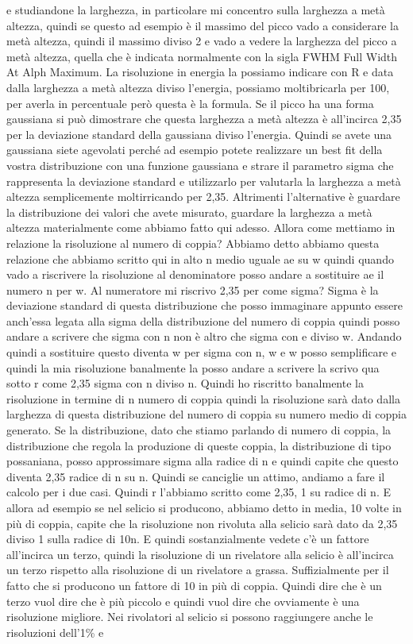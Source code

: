 e studiandone la larghezza, in particolare mi concentro sulla larghezza a metà altezza, quindi se questo ad esempio è il massimo del picco vado a considerare la metà altezza, quindi il massimo diviso 2 e vado a vedere la larghezza del picco a metà altezza, quella che è indicata normalmente con la sigla FWHM Full Width At Alph Maximum. La risoluzione in energia la possiamo indicare con R e data dalla larghezza a metà altezza diviso l'energia, possiamo moltibricarla per 100, per averla in percentuale però questa è la formula. Se il picco ha una forma gaussiana si può dimostrare che questa larghezza a metà altezza è all'incirca 2,35 per la deviazione standard della gaussiana diviso l'energia. Quindi se avete una gaussiana siete agevolati perché ad esempio potete realizzare un best fit della vostra distribuzione con una funzione gaussiana e strare il parametro sigma che rappresenta la deviazione standard e utilizzarlo per valutarla la larghezza a metà altezza semplicemente moltirricando per 2,35. Altrimenti l'alternative è guardare la distribuzione dei valori che avete misurato, guardare la larghezza a metà altezza materialmente come abbiamo fatto qui adesso. Allora come mettiamo in relazione la risoluzione al numero di coppia? Abbiamo detto abbiamo questa relazione che abbiamo scritto qui in alto n medio uguale ae su w quindi quando vado a riscrivere la risoluzione al denominatore posso andare a sostituire ae il numero n per w. Al numeratore mi riscrivo 2,35 per come sigma? Sigma è la deviazione standard di questa distribuzione che posso immaginare appunto essere anch'essa legata alla sigma della distribuzione del numero di coppia quindi posso andare a scrivere che sigma con n non è altro che sigma con e diviso w. Andando quindi a sostituire questo diventa w per sigma con n, w e w posso semplificare e quindi la mia risoluzione banalmente la posso andare a scrivere la scrivo qua sotto r come 2,35 sigma con n diviso n. Quindi ho riscritto banalmente la risoluzione in termine di n numero di coppia quindi la risoluzione sarà dato dalla larghezza di questa distribuzione del numero di coppia su numero medio di coppia generato. Se la distribuzione, dato che stiamo parlando di numero di coppia, la distribuzione che regola la produzione di queste coppia, la distribuzione di tipo possaniana, posso approssimare sigma alla radice di n e quindi capite che questo diventa 2,35 radice di n su n. Quindi se canciglie un attimo, andiamo a fare il calcolo per i due casi. Quindi r l'abbiamo scritto come 2,35, 1 su radice di n. E allora ad esempio se nel selicio si producono, abbiamo detto in media, 10 volte in più di coppia, capite che la risoluzione non rivoluta alla selicio sarà dato da 2,35 diviso 1 sulla radice di 10n. E quindi sostanzialmente vedete c'è un fattore all'incirca un terzo, quindi la risoluzione di un rivelatore alla selicio è all'incirca un terzo rispetto alla risoluzione di un rivelatore a grassa. Suffizialmente per il fatto che si producono un fattore di 10 in più di coppia. Quindi dire che è un terzo vuol dire che è più piccolo e quindi vuol dire che ovviamente è una risoluzione migliore. Nei rivolatori al selicio si possono raggiungere anche le risoluzioni dell'1\% e 

